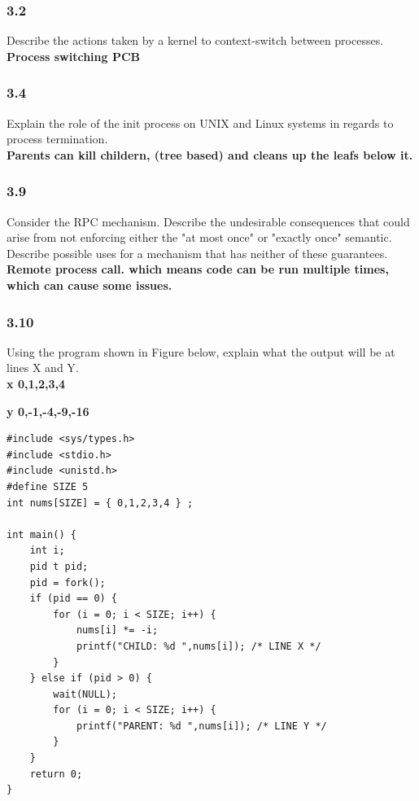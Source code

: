 \documentclass[a4paper,10pt,titlepage]{report}
\begin{document}
\subsubsection{3.2}
Describe the actions taken by a kernel to context-switch between processes.\\
\textbf{Process switching PCB}\\ \vspace{5mm}

\subsubsection{3.4}
Explain the role of the init process on UNIX and Linux systems in regards to process termination.\\
\textbf{Parents can kill childern, (tree based) and cleans up the leafs below it.}\\ \vspace{5mm}


\subsubsection{3.9}
Consider the RPC mechanism. Describe the undesirable consequences that could arise from not enforcing either the "at most once" or "exactly once" semantic. Describe possible uses for a mechanism that has neither of these guarantees.\\
\textbf{Remote process call. which means code can be run multiple times, which can cause some issues.} \\ \vspace{5mm}

\subsubsection{3.10}
Using the program shown in Figure below, explain what the output will be at lines X and Y.\\

\textbf{x { 0,1,2,3,4 }}

\textbf{y { 0,-1,-4,-9,-16 }}

\begin{lstlisting}[frame=single]
#include <sys/types.h>
#include <stdio.h>
#include <unistd.h>
#define SIZE 5
int nums[SIZE] = { 0,1,2,3,4 } ;
 
int main() {
    int i;
    pid t pid;
    pid = fork();
    if (pid == 0) {
        for (i = 0; i < SIZE; i++) {
            nums[i] *= -i;
            printf("CHILD: %d ",nums[i]); /* LINE X */
        }
    } else if (pid > 0) {
        wait(NULL);
        for (i = 0; i < SIZE; i++) {
            printf("PARENT: %d ",nums[i]); /* LINE Y */
        }
    }
    return 0;
}
\end{lstlisting} \vspace{5mm}
\end{document}
